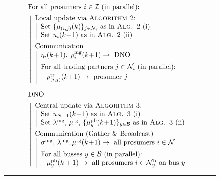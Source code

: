 \documentclass{IEEEtran}  %
\newcommand{\mc}{\mathcal}
\newcommand{\0}{\mathbf{0}}
\newcommand{\1}{\mathbf{1}}
\begin{document}
\begin{figure}
{\begin{minipage}{\columnwidth}
\medskip
\begin{align*}
& \text{For all prosumers $i \in \mc I$ (in parallel):}\\
\quad &\left|
\begin{array}{l}
\text{Local update via \textsc{Algorithm 2}:}\\
\left|
\begin{array}{l}
\text{Set $\{\mu_{(i,j)}(k)\}_{j \in \mc N_i}$ as in \textsc{Alg. 2} (i)}\\
\text{Set $u_i(k\!+\!1)$ as in \textsc{Alg. 2} (ii)}
\end{array}
\right.\\[1em]
 \text{Communication}\\
 \left|
\begin{array}{l}
\eta_i(k\!+\!1), \; p_i^{\text{mg}}(k\!+\!1) \rightarrow \text{ DNO}\\[.5em]
\text{For all trading partners } j \in \mc N_i \text{ (in parallel):}\\
 \left|
\begin{array}{l}
p_{(i,j)}^{\text{tr}}(k\!+\!1) \rightarrow \text{ prosumer } j
\end{array}
\right.
\end{array}
\right.
\end{array}
\right.\\[.5em]
& \text{DNO}\\
\quad &\left|
\begin{array}{l}
\text{Central update via \textsc{Algorithm 3}:}\\
\left|
\begin{array}{l}
\text{Set $u_{N+1}(k\!+\!1)$ as in \textsc{Alg. 3} (i)}\\
\text{Set $\lambda^{\text{mg}}$, $\mu^{\text{tg}}$, $\{ \mu_y^{\text{pb}}(k\!+\!1)\}_{y \in\mc B}$ as in \textsc{Alg. 3} (ii)}
\end{array}
\right.\\[1em]
\text{Communication (Gather \& Broadcast)}\\
 \left|
\begin{array}{l}
\sigma^{\mathrm{mg}},\, \lambda^{\text{mg}}, \mu^{\text{tg}}(k\!+\!1) \rightarrow \text{ all prosumers } i \in \mc N\\[.5em]
\text{For all busses } y \in \mc B \text{ (in parallel):}\\
 \left|
\begin{array}{l}
\mu_y^{\text{pb}}(k+1) \rightarrow \text{ all prosumers } i \in \mc N_y^{\text{b}} \text{ on bus } y%
\end{array}%
\right.%
\end{array}%
\right.\\[1em]
\end{array}%
\right.%
\end{align*}
\smallskip
\hrule
\end{minipage}
}
\end{figure}
\end{document}
